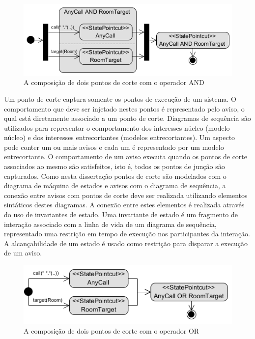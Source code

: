 \begin{figure}[h]
	\centering
	\includegraphics[scale=0.8]{img/pointcut_definition_and.png}
	\caption{A composição de dois pontos de corte com o operador AND}\label{fig:pointcut_definition_and}
\end{figure}

Um ponto de corte captura somente os pontos de execução de um sistema. O comportamento que deve ser injetado nestes pontos é representado pelo aviso,
o qual está diretamente associado a um ponto de corte. Diagramas de sequência são utilizados para representar o comportamento dos interesses núcleo
(modelo núcleo) e dos interesses entrecortantes (modelos entrecortantes). Um aspecto pode conter um ou mais avisos e cada um é representado por um
modelo entrecortante. O comportamento de um aviso executa quando os pontos de corte associados ao mesmo são satisfeitos, isto é, todos os pontos de
junção são capturados. Como nesta dissertação pontos de corte são modelados com o diagrama de máquina de estados e avisos com o diagrama de sequência,
a conexão entre avisos com pontos de corte deve ser realizada utilizando elementos sintáticos destes diagramas. A conexão entre estes elementos é
realizada através do uso de invariantes de estado. Uma invariante de estado é um fragmento de interação associado com a linha de vida de um diagrama
de sequência, representado uma restrição em tempo de execução nos participantes da interação. A alcançabilidade de um estado é usado como restrição
para disparar a execução de um aviso. 

\begin{figure}[!hb]
	\centering
	\includegraphics{img/pointcut_definition_or.png}
	\caption{A composição de dois pontos de corte com o operador OR}\label{fig:pointcut_definition_or}
\end{figure}


